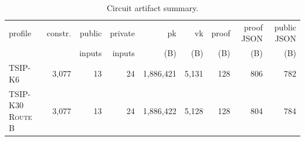 \begin{table}[t]
\centering
\caption{Circuit artifact summary.}
\label{tab:circuit-perf}
\small
\begin{tabular}{lrrrrrrrr}
\toprule
profile & constr. & public & private & pk & vk & proof & proof JSON & public JSON \\
 &  & inputs & inputs & (B) & (B) & (B) & (B) & (B) \\
\midrule
\textsc{TSIP-K6} & 3,077 & 13 & 24 & 1,886,421 & 5,131 & 128 & 806 & 782 \\
\textsc{TSIP-K30 Route B} & 3,077 & 13 & 24 & 1,886,422 & 5,128 & 128 & 804 & 784 \\
\bottomrule
\end{tabular}
\end{table}
